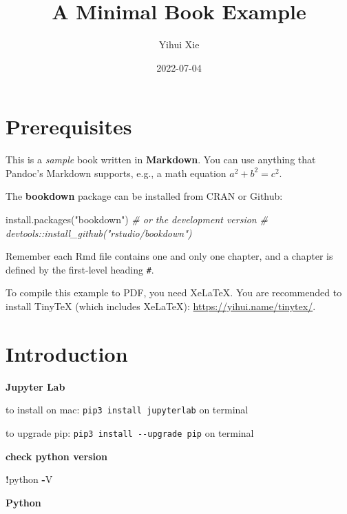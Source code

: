 \documentclass[
]{book}
\title{A Minimal Book Example}
\author{Yihui Xie}
\date{2022-07-04}
\newenvironment{Shaded}{\begin{snugshade}}{\end{snugshade}}
\newcommand{\CommentTok}[1]{\textcolor[rgb]{0.56,0.35,0.01}{\textit{#1}}}
\newcommand{\FunctionTok}[1]{\textcolor[rgb]{0.00,0.00,0.00}{#1}}
\newcommand{\NormalTok}[1]{#1}
\newcommand{\OperatorTok}[1]{\textcolor[rgb]{0.81,0.36,0.00}{\textbf{#1}}}
\newcommand{\StringTok}[1]{\textcolor[rgb]{0.31,0.60,0.02}{#1}}
\begin{document}
\maketitle

{
\setcounter{tocdepth}{1}
\tableofcontents
}
\hypertarget{prerequisites}{%
\chapter{Prerequisites}\label{prerequisites}}

This is a \emph{sample} book written in \textbf{Markdown}. You can use anything that Pandoc's Markdown supports, e.g., a math equation \(a^2 + b^2 = c^2\).

The \textbf{bookdown} package can be installed from CRAN or Github:

\begin{Shaded}
\begin{Highlighting}[]
\FunctionTok{install.packages}\NormalTok{(}\StringTok{"bookdown"}\NormalTok{)}
\CommentTok{\# or the development version}
\CommentTok{\# devtools::install\_github("rstudio/bookdown")}
\end{Highlighting}
\end{Shaded}

Remember each Rmd file contains one and only one chapter, and a chapter is defined by the first-level heading \texttt{\#}.

To compile this example to PDF, you need XeLaTeX. You are recommended to install TinyTeX (which includes XeLaTeX): \url{https://yihui.name/tinytex/}.

\hypertarget{intro}{%
\chapter{Introduction}\label{intro}}

\textbf{Jupyter Lab}

to install on mac: \texttt{pip3\ install\ jupyterlab} on terminal

to upgrade pip: \texttt{pip3\ install\ -\/-upgrade\ pip} on terminal

\textbf{check python version}

\begin{Shaded}
\begin{Highlighting}[]
\OperatorTok{!}\NormalTok{python }\OperatorTok{{-}}\NormalTok{V}
\end{Highlighting}
\end{Shaded}

\textbf{Python}
\end{document}
